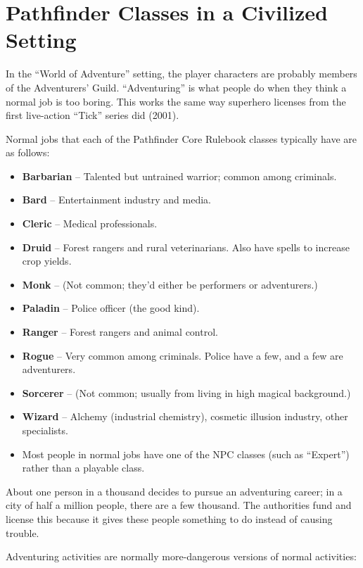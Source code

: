 %
%
\section{Pathfinder Classes in a Civilized Setting}

In the ``World of Adventure'' setting, the player characters are probably
members of the Adventurers' Guild. ``Adventuring'' is what people do when
they think a normal job is too boring. This works the same way superhero
licenses from the first live-action ``Tick'' series did (2001).

Normal jobs that each of the Pathfinder Core Rulebook classes typically
have are as follows:

\begin{itemize}
%
\item \textbf{Barbarian} -- Talented but untrained warrior; common among
criminals.
%
\item \textbf{Bard} -- Entertainment industry and media.
%
\item \textbf{Cleric} -- Medical professionals.
%
\item \textbf{Druid} -- Forest rangers and rural veterinarians. Also have
spells to increase crop yields.
%
\item \textbf{Monk} -- (Not common; they'd either be performers or
adventurers.)
%
\item \textbf{Paladin} -- Police officer (the good kind).
%
\item \textbf{Ranger} -- Forest rangers and animal control.
%
\item \textbf{Rogue} -- Very common among criminals. Police have a few,
and a few are adventurers.
%
\item \textbf{Sorcerer} -- (Not common; usually from living in high magical
background.)
%
\item \textbf{Wizard} -- Alchemy (industrial chemistry), cosmetic illusion
industry, other specialists.
%
\item Most people in normal jobs have one of the NPC classes (such as
``Expert'') rather than a playable class.
%
\end{itemize}

About one person in a thousand decides to pursue an adventuring career; in
a city of half a million people, there are a few thousand. The authorities
fund and license this because it gives these people something to do instead
of causing trouble.

Adventuring activities are normally more-dangerous versions of normal
activities:

